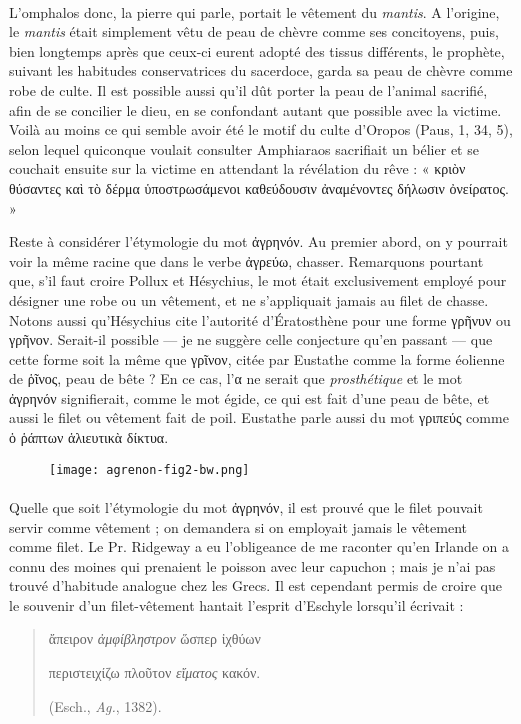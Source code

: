\documentclass[a4paper, 11pt, oneside, polutonikogreek, french]{article}
\begin{document}
\paragraph{}
L'omphalos donc, la pierre qui parle, portait le vêtement du \emph{mantis}. A l'origine, le \emph{mantis} était simplement vêtu de peau de chèvre comme ses concitoyens, puis, bien longtemps après que ceux-ci eurent adopté des tissus différents, le prophète, suivant les habitudes conservatrices du sacerdoce, garda sa peau de chèvre comme robe de culte. Il est possible aussi qu'il dût porter la peau de l'animal sacrifié, afin de se concilier le dieu, en se confondant autant que possible avec la victime. Voilà au moins ce qui semble avoir été le motif du culte d'Oropos (Paus, 1, 34, 5), selon lequel quiconque voulait consulter Amphiaraos sacrifiait un bélier et se couchait ensuite sur la victime en attendant la révélation du rêve : « κριὸν θύσαντες καὶ τὸ δέρμα ὑποστρωσάμενοι καθεύδουσιν ἀναμένοντες δήλωσιν ὀνείρατος. »

Reste à considérer l'étymologie du mot ἀγρηνόν. Au premier abord, on y pourrait voir la même racine que dans le verbe ἀγρεύω, chasser. Remarquons pourtant que, s'il faut croire Pollux et Hésychius, le mot était exclusivement employé pour désigner une robe ou un vêtement, et ne s'appliquait jamais au filet de chasse. Notons aussi qu'Hésychius cite l'autorité d'Ératosthène pour une forme γρῆνυν ou γρῆνον. Serait-il possible --- je ne suggère celle conjecture qu'en passant --- que cette forme soit la même que γρῖνον, citée par Eustathe comme la forme éolienne de ῥῖνος, peau de bête ? En ce cas, l'α ne serait que \emph{prosthétique} et le mot ἀγρηνόν signifierait, comme le mot égide, ce qui est fait d'une peau de bête, et aussi le filet ou vêtement fait de poil. Eustathe parle aussi du mot γριπεύς comme ὁ ῥάπτων ἁλιευτικὰ δίκτυα.

\begin{figure}[ht]
\centering
\texttt{[image: agrenon-fig2-bw.png]}
\end{figure}
\paragraph{}
Quelle que soit l'étymologie du mot ἀγρηνόν, il est prouvé que le filet pouvait servir comme vêtement ; on demandera si on employait jamais le vêtement comme filet. Le Pr. Ridgeway a eu l'obligeance de me raconter qu'en Irlande on a connu des moines qui prenaient le poisson avec leur capuchon ; mais je n'ai pas trouvé d'habitude analogue chez les Grecs. Il est cependant permis de croire que le souvenir d'un filet-vêtement hantait l'esprit d'Eschyle lorsqu'il écrivait :
\begin{quotation}\normalsize
ἄπειρον \emph{ἀμφίβληστρον} ὥσπερ ἰχθύων
    
περιστειχίζω πλοῦτον \emph{εἴματος} κακόν.

(Esch., \emph{Ag.}, 1382).
\end{quotation}
\end{document}
